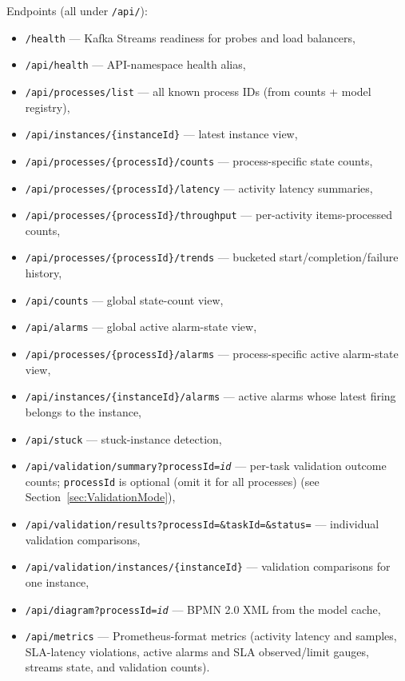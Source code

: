 Endpoints (all under \texttt{/api/}):
\begin{itemize}
\item \texttt{/health} --- Kafka Streams readiness for probes and load balancers,
\item \texttt{/api/health} --- API-namespace health alias,
\item \texttt{/api/processes/list} --- all known process IDs (from counts + model registry),
\item \texttt{/api/instances/\{instanceId\}} --- latest instance view,
\item \texttt{/api/processes/\{processId\}/counts} --- process-specific state counts,
\item \texttt{/api/processes/\{processId\}/latency} --- activity latency summaries,
\item \texttt{/api/processes/\{processId\}/throughput} --- per-activity items-processed counts,
\item \texttt{/api/processes/\{processId\}/trends} --- bucketed start/completion/failure history,
\item \texttt{/api/counts} --- global state-count view,
\item \texttt{/api/alarms} --- global active alarm-state view,
\item \texttt{/api/processes/\{processId\}/alarms} --- process-specific active alarm-state view,
\item \texttt{/api/instances/\{instanceId\}/alarms} --- active alarms whose latest firing belongs to the instance,
\item \texttt{/api/stuck} --- stuck-instance detection,
\item \texttt{/api/validation/summary?processId=\textit{id}} --- per-task validation outcome counts; \texttt{processId} is optional (omit it for all processes) (see Section~\ref{sec:ValidationMode}),
\item \texttt{/api/validation/results?processId=\&taskId=\&status=} --- individual validation comparisons,
\item \texttt{/api/validation/instances/\{instanceId\}} --- validation comparisons for one instance,
\item \texttt{/api/diagram?processId=\textit{id}} --- BPMN 2.0 XML from the model cache,
\item \texttt{/api/metrics} --- Prometheus-format metrics (activity latency and
      samples, SLA-latency violations, active alarms and SLA observed/limit gauges,
      streams state, and validation counts).
\end{itemize}

